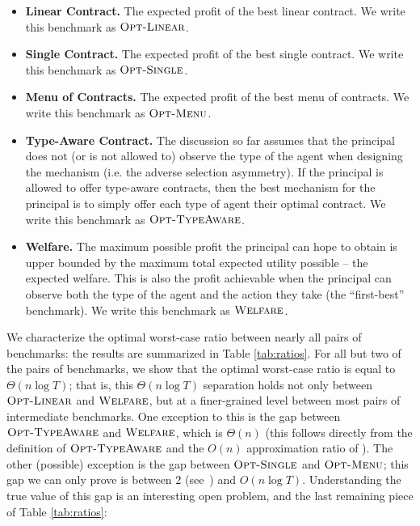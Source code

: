 \documentclass{article}
\newcommand{\jonnote}[1]{}
\newcommand{\OWelfare}{\textsc{Welfare}}
\newcommand{\OTypeAware}{\textsc{Opt-TypeAware}}
\newcommand{\OMenu}{\textsc{Opt-Menu}}
\newcommand{\OSingle}{\textsc{Opt-Single}}
\newcommand{\OLinear}{\textsc{Opt-Linear}}
\begin{document}

\begin{itemize}[noitemsep]
  \item \textbf{Linear Contract.} The expected profit of the best linear contract. We write this benchmark as $\OLinear$.
    \item \textbf{Single Contract.} The expected profit of the best single contract. We write this benchmark as $\OSingle$.
  \item \textbf{Menu of Contracts.} The expected profit of the best menu of contracts. We write this benchmark as $\OMenu$.
  \item \textbf{Type-Aware Contract.} The discussion so far assumes that the principal does not (or is not allowed to) observe the type of the agent when designing the mechanism (i.e. the adverse selection asymmetry). If the principal is allowed to offer type-aware contracts, then the best mechanism for the principal is to simply offer each type of agent their optimal contract. We write this benchmark as $\OTypeAware$.
  \item \textbf{Welfare.} The maximum possible profit the principal can hope to obtain is upper bounded by the maximum total expected utility possible -- the expected welfare. This is also the profit achievable when the principal can observe both the type of the agent and the action they take (the ``first-best'' benchmark). We write this benchmark as $\OWelfare$.
\end{itemize}

We characterize the optimal worst-case ratio between nearly all pairs of benchmarks: the results are summarized in Table \ref{tab:ratios}. For all but two of the pairs of benchmarks, we show that the optimal worst-case ratio is equal to $\Theta(n\log T)$; that is, this $\Theta(n\log T)$ separation holds not only between $\OLinear$ and $\OWelfare$, but at a finer-grained level between most pairs of intermediate benchmarks. One exception to this is the gap between $\OTypeAware$ and $\OWelfare$, which is $\Theta(n)$ (this follows directly from the definition of $\OTypeAware$ and the $O(n)$ approximation ratio of \cite{dutting2019simple}). The other (possible) exception is the gap between $\OSingle$ and $\OMenu$; this gap we can only prove is between $2$ (see~) and $O(n \log T)$. Understanding the true value of this gap is an interesting open problem, and the last remaining piece of Table \ref{tab:ratios}:
\end{document}
